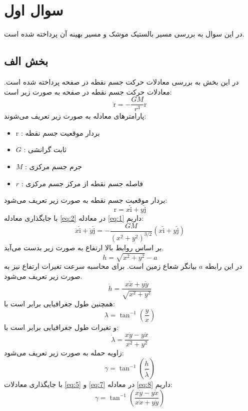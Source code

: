\section{سوال اول}
در این سوال به بررسی مسیر بالستیک موشک و مسیر بهینه آن پرداخته شده است.
\subsection{بخش الف}
در این بخش به بررسی معادلات حرکت جسم نقطه در صفحه پرداخته شده است. معادلات حرکت جسم نقطه در صفحه به صورت زیر است:
\begin{equation}
    \label{eq:1}
    \ddot{\boldsymbol{\mathrm{r}}} = -\dfrac{GM}{r^3}\boldsymbol{\mathrm{r}}
\end{equation}
پارامترهای معادله به صورت زیر تعریف می‌شوند:
\begin{itemize}
    \item $\boldsymbol{\mathrm{r}}$ : بردار موقعیت جسم نقطه
    \item $G$ : ثابت گرانشی
    \item $M$ : جرم جسم مرکزی
    \item $r$ : فاصله جسم نقطه از مرکز جسم مرکزی
\end{itemize}
بردار موقعیت جسم نقطه به صورت زیر تعریف می‌شود:
\begin{equation}
    \label{eq:2}
    \boldsymbol{\mathrm{r}} = x\hat{\boldsymbol{\mathrm{i}}} + y\hat{\boldsymbol{\mathrm{j}}}
\end{equation}
با جایگذاری معادله \eqref{eq:2} در معادله \eqref{eq:1} داریم:
\begin{equation}
    \label{eq:3}
    \ddot{x}\hat{\boldsymbol{\mathrm{i}}} + \ddot{y}\hat{\boldsymbol{\mathrm{j}}} = -\dfrac{GM}{(x^2 + y^2)^{3/2}}(x\hat{\boldsymbol{\mathrm{i}}} + y\hat{\boldsymbol{\mathrm{j}}})
\end{equation}
بر اساس روابط بالا ارتفاع به صورت زیر بدست می‌آید.
\begin{equation}
    \label{eq:4}
    h =\sqrt{x^2 + y^2} - a
\end{equation}
در این رابطه $a$ بیانگر شعاع زمین است. برای محاسبه سرعت 
تغیرات ارتفاع نیز به صورت زیر تعریف می‌شود.
\begin{equation}
    \label{eq:5}
    \dot{h} = \dfrac{x\dot{x} + y\dot{y}}{\sqrt{x^2 + y^2}}
\end{equation}
همچنین طول جغرافیایی برابر است با:
\begin{equation}
    \label{eq:6}
    \lambda = \tan^{-1}\left(\dfrac{y}{x}\right)
\end{equation}
و تغیرات طول جغرافیایی برابر است با:
\begin{equation}
    \label{eq:7}
    \dot{\lambda} = \dfrac{x\dot{y} - y\dot{x}}{x^2 + y^2}
\end{equation}
زاویه حمله به صورت زیر تعریف می‌شود:
\begin{equation}
    \label{eq:8}
    \gamma = \tan^{-1}\left(\dfrac{\dot{h}}{\dot{\lambda}}\right)
\end{equation}
با جایگذاری معادلات \eqref{eq:5} و \eqref{eq:7} در معادله \eqref{eq:8} داریم:
\begin{equation}
    \label{eq:9}
    \gamma = \tan^{-1}\left(\dfrac{x\dot{y} - y\dot{x}}{x\dot{x} + y\dot{y}}\right)
\end{equation}


